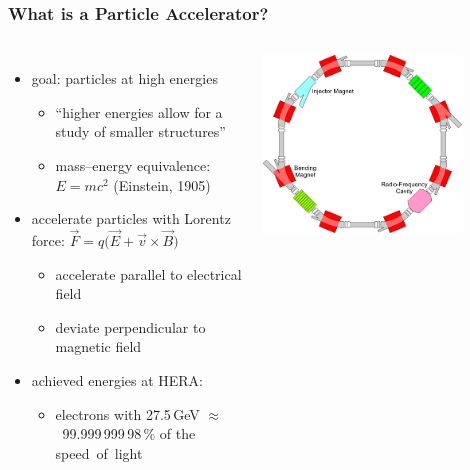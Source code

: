 \documentclass[10pt,t]{beamer}
\begin{document}
\begin{frame}
\frametitle{What is a Particle Accelerator?}
\vspace*{-2\baselineskip}
\begin{columns}[c]
\begin{itemize}
    \item goal: particles at high energies
    \begin{itemize}
        \item ``higher energies allow for a study of smaller structures''
        \item mass--energy equivalence: $E=mc^2$ (Einstein, 1905)
    \end{itemize}
    \item accelerate particles with Lorentz force: $\vec{F}=q\Big(\vec{E}+\vec{v}\times\vec{B}\Big)$
    \begin{itemize}
        \item accelerate parallel to electrical field
        \item deviate perpendicular to magnetic field
    \end{itemize}
    \item achieved energies at HERA:
    \begin{itemize}
        \item electrons with 27.5\,GeV $\approx$~99.999\,999\,98\,\% of the speed~of~light
    \end{itemize}
\end{itemize}
\centering
    \includegraphics[width=0.8\textwidth]{beschleuniger-schema-en} \\[1em]

\end{columns}
\end{frame}
\end{document}
